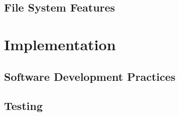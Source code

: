 











\subsection{File System Features}
\label{sec:fs-features}

\section{Implementation}

\subsection{Software Development Practices}

\subsection{Testing}
